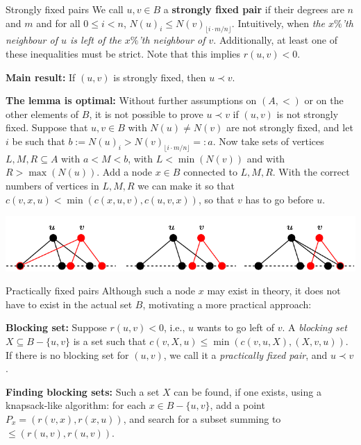 \documentclass[final]{beamer}
\newlength{\colwidth}
\theoremstyle{remark}
\renewcommand{\b}{\prec}
\begin{document}
\begin{frame}[t]
\begin{columns}[t]
\begin{column}{\colwidth}
      \begin{block}{Strongly fixed pairs}
        We call $u, v \in B$ a \textbf{strongly fixed pair} if their degrees are $n$
        and $m$ and for all $0 \leq i < n$, $N(u)_i \leq N(v)_{\lfloor i\cdot m/n
          \rfloor}$.
        Intuitively, when \emph{the $x\%$'th neighbour of $u$ is left of the $x\%$'th
        neighbour of $v$}. Additionally, at least one of these inequalities must be strict.
        Note that this implies $r(u, v) < 0$.

        \textbf{Main result:}
        If $(u, v)$ is strongly fixed, then $u \b v$.

        \textbf{The lemma is optimal:}
        Without further assumptions on $(A, <)$ or on the other elements of $B$, it is not
          possible to prove $u \b v$ if $(u, v)$ is not strongly fixed.
        Suppose that $u, v \in B$ with $N(u) \neq N(v)$ are not strongly fixed, and let $i$ be
        such that $b:=N(u)_i > N(v)_{\lfloor i\cdot m/n\rfloor}=:a$. Now take sets of vertices $L, M,
          R \subseteq A$ with $a < M < b$, with $L < \min(N(v))$ and with $R > \max(N(u))$.
          Add a node $x \in B$ connected to $L, M, R$. With the correct numbers of vertices in
          $L, M, R$ we can make it so that $c(v, x, u) < \min(c(x, u, v), c(u, v, x))$, so that
        $v$ has to go before $u$.

        \centering
        \includegraphics[scale=1.5]{fig/strongly-fixed.pdf}

      \end{block}

      \begin{block}{Practically fixed pairs}
        Although such a node $x$ may exist in theory, it does
        not have to exist in the actual set $B$, motivating a more practical approach:

        \textbf{Blocking set:}
        Suppose $r(u,v)< 0$, i.e., $u$ wants to go left of $v$.
        A \emph{blocking set} $X\subseteq B-\{u,v\}$ is a set such that $c(v,X,u) \leq \min(c(v, u,
        X), (X, v, u))$.  If there is no blocking set for $(u, v)$, we call it a
        \emph{practically fixed pair}, and $u\b v$.
      \end{block}

      \textbf{Finding blocking sets:}
      Such a set $X$ can be found, if one exists, using a knapsack-like algorithm: for
      each $x\in B-\{u,v\}$, add a point $P_x = (r(v, x), r(x, u))$, and search for a subset summing
      to ${\leq{}(r(u, v), r(u, v))}$.


\end{column}
\end{columns}
\end{frame}
\end{document}
